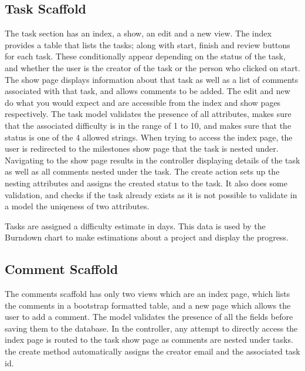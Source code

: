\documentclass[a4wide, 11pt]{article}
\begin{document}
\subsection{Task Scaffold}
The task section has an index, a show, an edit and a new view. The index provides a table that lists the tasks; along with start, finish and review buttons for each task. These conditionally appear depending on the status of the task, and whether the user is the creator of the task or the person who clicked on start. The show page displays information about that task as well as a list of comments associated with that task, and allows comments to be added. The edit and new do what you would expect and are accessible from the index and show pages respectively. The task model validates the presence of all attributes, makes sure that the associated difficulty is in the range of 1 to 10, and makes sure that the status is one of the 4 allowed strings. When trying to access the index page, the user is redirected to the milestones show page that the task is nested under. Navigating to the show page results in the controller displaying details of the task as well as all comments nested under the task. The create action sets up the nesting attributes and assigns the created status to the task. It also does some validation, and checks if the task already exists as it is not possible to validate in a model the uniqeness of two attributes. 

Tasks are assigned a difficulty estimate in days. This data is used by the Burndown chart to make estimations about a project and display the progress.
\clearpage

\subsection{Comment Scaffold}
The comments scaffold has only two views which are an index page, which lists the comments in a bootstrap formatted table, and a new page which allows the user to add a comment. The model validates the presence of all the fields before saving them to the database. In the controller, any attempt to directly access the index page is routed to the task show page as comments are nested under tasks. the create method automatically assigns the creator email and the associated task id.
\end{document}
